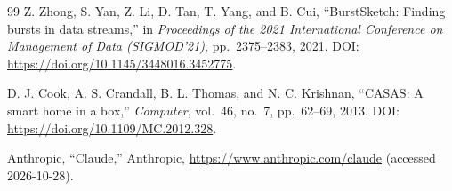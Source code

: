 \documentclass[10pt,twocolumn]{AROB}
\begin{document}
\begin{thebibliography}{99}
Z. Zhong, S. Yan, Z. Li, D. Tan, T. Yang, and B. Cui,
``BurstSketch: Finding bursts in data streams,''
in \textit{Proceedings of the 2021 International Conference on Management of Data (SIGMOD'21)},
pp.~2375--2383, 2021. DOI: \url{https://doi.org/10.1145/3448016.3452775}.

D. J. Cook, A. S. Crandall, B. L. Thomas, and N. C. Krishnan,
``CASAS: A smart home in a box,''
{\it Computer}, vol.~46, no.~7, pp.~62--69, 2013.
DOI: \url{https://doi.org/10.1109/MC.2012.328}.

Anthropic,
``Claude,'' Anthropic, \url{https://www.anthropic.com/claude} (accessed 2026-10-28).

\end{thebibliography}


\end{document}
